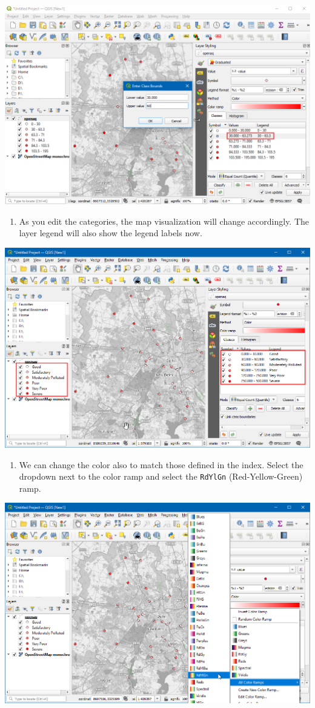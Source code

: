 \documentclass[
  12pt,
  a4paper]{article}
\providecommand{\tightlist}{%
  \setlength{\itemsep}{0pt}\setlength{\parskip}{0pt}}
\begin{document}
\begin{center}\includegraphics[width=0.75\linewidth]{images/spatial_data_viz/aq8} \end{center}

\begin{enumerate}
\def\labelenumi{\arabic{enumi}.}
\setcounter{enumi}{8}
\tightlist
\item
  As you edit the categories, the map visualization will change
  accordingly. The layer legend will also show the legend labels now.
\end{enumerate}

\begin{center}\includegraphics[width=0.75\linewidth]{images/spatial_data_viz/aq9} \end{center}

\begin{enumerate}
\def\labelenumi{\arabic{enumi}.}
\setcounter{enumi}{9}
\tightlist
\item
  We can change the color also to match those defined in the index.
  Select the dropdown next to the color ramp and select the
  \texttt{RdYlGn} (Red-Yellow-Green) ramp.
\end{enumerate}

\begin{center}\includegraphics[width=0.75\linewidth]{images/spatial_data_viz/aq10} \end{center}
\end{document}
